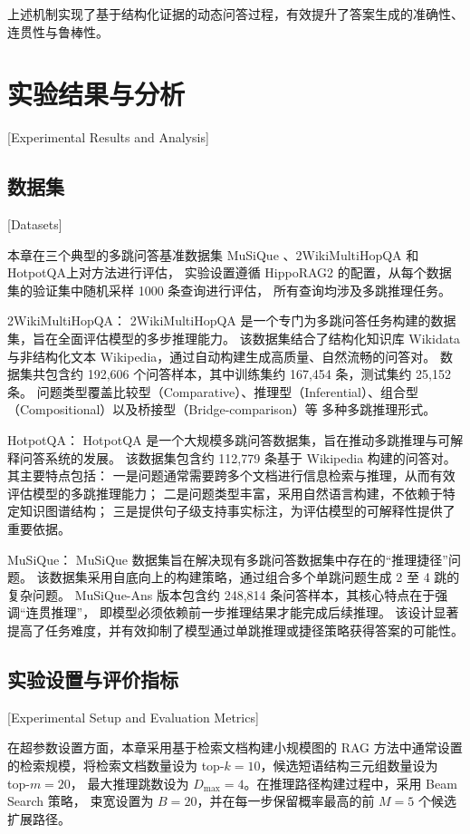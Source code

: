 上述机制实现了基于结构化证据的动态问答过程，有效提升了答案生成的准确性、连贯性与鲁棒性。

\section{实验结果与分析}[Experimental Results and Analysis]

\subsection{数据集}[Datasets]

本章在三个典型的多跳问答基准数据集 MuSiQue\cite{musique} 、2WikiMultiHopQA\cite{2wikimultihopqa}  和 HotpotQA\cite{hotpotqa}上对方法进行评估，
实验设置遵循 HippoRAG2\cite{hipporag2} 的配置，从每个数据集的验证集中随机采样 1000 条查询进行评估，
所有查询均涉及多跳推理任务。

2WikiMultiHopQA：
2WikiMultiHopQA 是一个专门为多跳问答任务构建的数据集，旨在全面评估模型的多步推理能力。
该数据集结合了结构化知识库 Wikidata 与非结构化文本 Wikipedia，通过自动构建生成高质量、自然流畅的问答对。
数据集共包含约 192,606 个问答样本，其中训练集约 167,454 条，测试集约 25,152 条。
问题类型覆盖比较型（Comparative）、推理型（Inferential）、组合型（Compositional）以及桥接型（Bridge-comparison）等
多种多跳推理形式。

HotpotQA：
HotpotQA 是一个大规模多跳问答数据集，旨在推动多跳推理与可解释问答系统的发展。
该数据集包含约 112,779 条基于 Wikipedia 构建的问答对。其主要特点包括：
一是问题通常需要跨多个文档进行信息检索与推理，从而有效评估模型的多跳推理能力；
二是问题类型丰富，采用自然语言构建，不依赖于特定知识图谱结构；
三是提供句子级支持事实标注，为评估模型的可解释性提供了重要依据。

MuSiQue：
MuSiQue 数据集旨在解决现有多跳问答数据集中存在的“推理捷径”问题。
该数据集采用自底向上的构建策略，通过组合多个单跳问题生成 2 至 4 跳的复杂问题。
MuSiQue-Ans 版本包含约 248,814 条问答样本，其核心特点在于强调“连贯推理”，
即模型必须依赖前一步推理结果才能完成后续推理。
该设计显著提高了任务难度，并有效抑制了模型通过单跳推理或捷径策略获得答案的可能性。

\subsection{实验设置与评价指标}[Experimental Setup and Evaluation Metrics]

在超参数设置方面，本章采用基于检索文档构建小规模图的 RAG 方法\cite{fang2024trace}中通常设置的检索规模，将检索文档数量设为 top-$k=10$，候选短语结构三元组数量设为 top-$m=20$，
最大推理跳数设为 $D_{\text{max}}=4$。在推理路径构建过程中，采用 Beam Search 策略，
束宽设置为 $B=20$，并在每一步保留概率最高的前 $M=5$ 个候选扩展路径。

